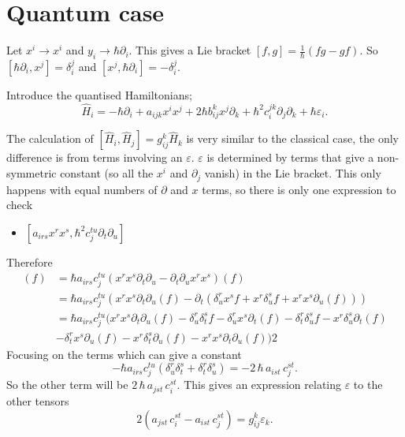 \documentclass{article}
\begin{document}
    
 \section{Quantum case}
    Let \(x^i \rightarrow x^i \) and \( y_i \rightarrow \hbar \partial_i \). This gives a Lie bracket \( [f,g] = \frac{1}{\hbar} \left( f g - g f \right) \). 
    So \( [ \hbar \partial_i , x^j ] = \delta_i^j \) and \( [ x^j, \hbar \partial_i ] = - \delta_i^j \).
    
    Introduce the quantised Hamiltonians;
    \[ \widehat{H}_i = -\hbar \partial_i + a_{ijk} x^i x^j + 2 \hbar b_{ij}^k x^j \partial_k + \hbar^2 c_i^{jk} \partial_j \partial_k + \hbar \varepsilon_i. \]
    
    The calculation of \( [\widehat{H}_i,\widehat{H}_j]= g_{ij}^k \widehat{H}_k\) is very similar to the classical case, the only difference is from terms involving an \( \varepsilon \). \( \varepsilon \) is determined by terms that give a non-symmetric constant (so all the \(x^i\) and \( \partial_j\) vanish) in the Lie bracket. This only happens with equal numbers of \( \partial \) and \( x\) terms, so there is only one expression to check
    
    \begin{itemize}
        \item \(  [ a_{irs} x^r x^s ,   \hbar^2 c_j^{tu} \partial_t \partial_u ] \)
     \end{itemize}
     
    Therefore
    \begin{align*}
          [ a_{irs} x^r x^s ,   \hbar^2 c_j^{tu} \partial_t \partial_u ] (f) &=  \hbar a_{irs} c_j^{tu} \left( x^r x^s \partial_t \partial_u - \partial_t \partial_u x^r x^s \right)(f) \\
                                                                             &= \hbar a_{irs} c_j^{tu} \left( x^r x^s \partial_t \partial_u (f) - \partial_t ( \delta_u^r x^s f + x^r \delta_u^s f + x^r x^s \partial_u (f)  ) \right)\\
                                                                            &= \hbar a_{irs} c_j^{tu} \big( x^r x^s \partial_t \partial_u (f) - \delta_u^r \delta_t^s f - \delta_u^r x^s \partial_t (f)  - \delta^r_t \delta_u^s f - x^r \delta_u^s \partial_t(f) \\
                                                                            &- \delta_t^r x^s \partial_u (f)  - x^r \delta^s_t \partial_u (f) - x^r x^s \partial_t \partial_u (f) \big)
2    \end{align*}
    Focusing on the terms which can give a constant 
    \[ -\hbar  a_{irs} c_j^{tu} \left( \delta_u^r \delta_t^s  + \delta^r_t \delta_u^s \right) = -2 \, \hbar \,  a_{ist} \, c_j^{st}. \]
    So the other term will be \( 2 \, \hbar \,  a_{jst} \, c_i^{st} \). This gives an expression relating \( \varepsilon\) to the other tensors
    \[ 2 \left( a_{jst} \, c_i^{st} - a_{ist} \, c_j^{st} \right) = g_{ij}^k \varepsilon_k. \]
\end{document}
